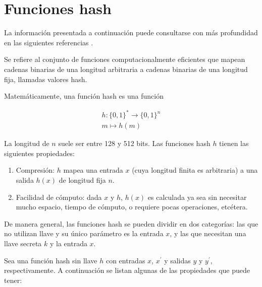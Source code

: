 %
%

\section{Funciones hash}
\label{sec:hash}

La información presentada a continuación puede consultarse con más profundidad
en las siguientes referencias
\cite{hash_hussein, menezes, DBLP:series/isc/DelfsK07, hash_gupta}.

Se refiere al conjunto de funciones computacionalmente eficientes que
mapean cadenas binarias de una longitud arbitraria a cadenas binarias
de una longitud fija, llamadas valores hash.

Matemáticamente, una función hash es una función

\begin{equation}
  \label{funcion_hash_def}
  \begin{split}
    h: \{0, 1\}^* \longrightarrow \{0,1\}^n \\
    m \longmapsto h(m)
  \end{split}
\end{equation}

La longitud de $n$ suele ser entre 128 y 512 bits. Las funciones hash
$h$ tienen las siguientes propiedades:

\begin{enumerate}
  \item Compresión: $h$ mapea una entrada $x$ (cuya longitud
    finita es arbitraria) a una salida $h(x)$ de longitud fija $n$.
  \item Facilidad de cómputo: dada $x$ y $h$, $h(x)$ es
    calculada ya sea sin necesitar mucho espacio, tiempo de cómputo, o
    requiere pocas operaciones, etcétera.
\end{enumerate}

De manera general, las funciones hash se pueden dividir en dos
categorías: las que no utilizan llave y su único parámetro es la entrada
$x$, y las que necesitan una llave secreta $k$ y la entrada $x$.

Sea una función hash sin llave $h$ con entradas $x$, $x^\prime$ y
salidas $y$ y $y^\prime$, respectivamente. A continuación se listan
algunas de las propiedades que puede tener:

